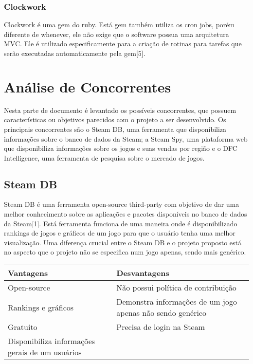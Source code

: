 \subsubsection*{Clockwork}
Clockwork é uma gem do ruby. Está gem também utiliza os cron jobs, porém diferente de whenever, ele não exige que o software possua uma arquitetura MVC. Ele é utilizado especificamente para a criação de rotinas para tarefas que serão executadas automaticamente pela gem[5].
\section*{Análise de Concorrentes}
Nesta parte de documento é levantado os possíveis concorrentes, que possuem características ou objetivos parecidos com o projeto a ser desenvolvido. Os principais concorrentes são o Steam DB, uma ferramenta que disponibiliza informações sobre o banco de dados da Steam; a Steam Spy, uma plataforma web que disponibiliza informações sobre os jogos e suas vendas por região e o DFC Intelligence, uma ferramenta de pesquisa sobre o mercado de jogos.
\subsection*{Steam DB}
Steam DB é uma ferramenta open-source third-party com objetivo de dar uma melhor conhecimento sobre as aplicações e pacotes disponíveis no banco de dados da Steam[1]. Está ferramenta funciona de uma maneira onde é disponibilizado rankings de jogos e gráficos de um jogo para que o usuário tenha uma melhor visualização. Uma diferença crucial entre o Steam DB e o projeto proposto está no aspecto que o projeto não se especifica num jogo apenas, sendo mais genérico.
\begin{center}
\begin{tabular}{|p{7cm}|p{7cm}|}
\hline \textbf{Vantagens} & \textbf{Desvantagens}
\\
\hline Open-source & Não possui política de contribuição
\\
\hline Rankings e gráficos & Demonstra informações de um jogo apenas não sendo genérico
\\
\hline Gratuito & Precisa de login na Steam
\\
\hline Disponibiliza informações gerais de um usuários &
\\
\hline
\end{tabular}
\end{center}
